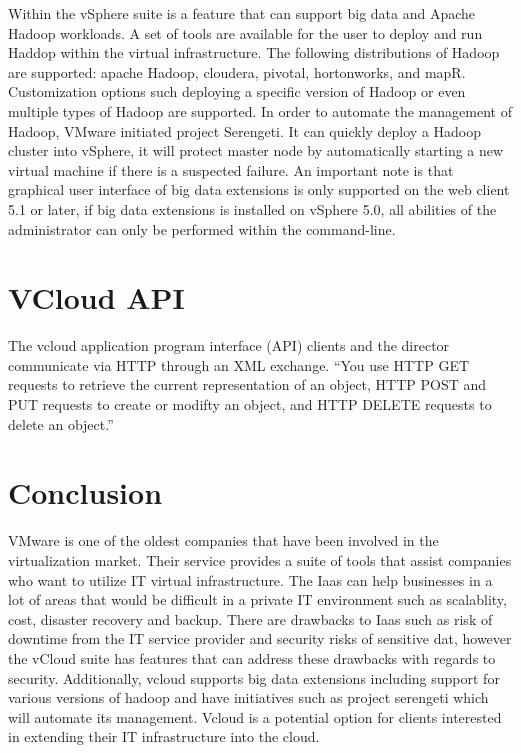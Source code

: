 \documentclass[9pt,twocolumn,twoside]{../../styles/osajnl}
\begin{document}
Within the vSphere suite is a feature that can support big data and
Apache Hadoop workloads.  A set of tools are available for the user to
deploy and run Haddop within the virtual infrastructure.  The
following distributions of Hadoop are supported: apache Hadoop,
cloudera, pivotal, hortonworks, and mapR.  Customization options such
deploying a specific version of Hadoop or even multiple types of
Hadoop are supported.  In order to automate the management of Hadoop,
VMware initiated project Serengeti.  It can quickly deploy a Hadoop
cluster into vSphere, it will protect master node by automatically
starting a new virtual machine if there is a suspected failure.  An
important note is that graphical user interface of big data extensions
is only supported on the web client 5.1 or later, if big data
extensions is installed on vSphere 5.0, all abilities of the
administrator can only be performed within the
command-line. \cite{www-vmware2}

\section{VCloud API}

The vcloud application program interface (API) clients and the
director communicate via HTTP through an XML exchange. “You use HTTP
GET requests to retrieve the current representation of an object, HTTP
POST and PUT requests to create or modifty an object, and HTTP DELETE
requests to delete an object.” \cite{www-api}


\section{Conclusion}

VMware is one of the oldest companies that have been involved in the
virtualization market.  Their service provides a suite of tools that
assist companies who want to utilize IT virtual infrastructure.  The
Iaas can help businesses in a lot of areas that would be difficult in
a private IT environment such as scalablity, cost, disaster recovery
and backup.  There are drawbacks to Iaas such as risk of downtime from
the IT service provider and security risks of sensitive dat, however
the vCloud suite has features that can address these drawbacks with
regards to security.  Additionally, vcloud supports big data
extensions including support for various versions of hadoop and have
initiatives such as project serengeti which will automate its
management. Vcloud is a potential option for clients interested in
extending their IT infrastructure into the cloud.



\end{document}
